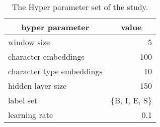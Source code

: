 \documentclass[11pt,letterpaper]{article}
\begin{document}
\begin{table}[t]
 \begin{center}                                                                                                                                                                                                                                                                                                             
\caption{The Hyper parameter set of the study.}                                                                                                                                                                                                                                                                                  
\label{parameter}                                                                                                                                                                                                                                                                                                           
 \begin{tabular}{p{50mm}| r }
  \toprule
    \multicolumn{1}{c|}{hyper parameter} & \multicolumn{1}{c}{value} \\
    \midrule                                                                                                                                             
    window size & 5 \\                                                                                                                                        
    character embeddings &  100\\                                                                                                                           
    character type embeddings  &  10\\                                                                                                                          
    hidden layer size &  150\\                                                                                                                                     
    label set& \{B, I, E, S\} \\                                                                                                                                      
    learning rate  &0.1\\                                                                                                                                           

\end{tabular}
\end{center}
\end{table}
\end{document}
